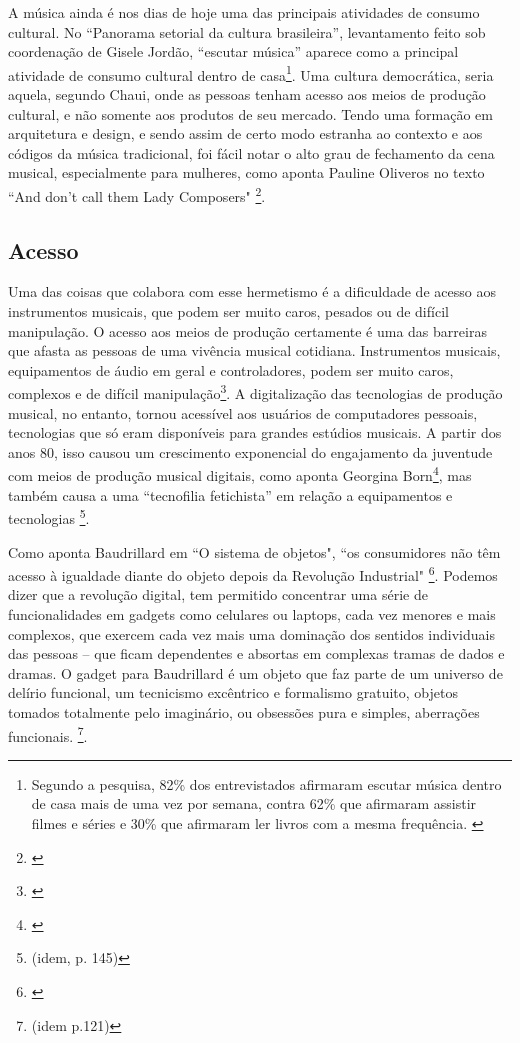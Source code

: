  A música ainda é nos dias de hoje uma das principais atividades de consumo cultural. No ``Panorama setorial da cultura brasileira'', levantamento feito sob coordenação de Gisele Jordão, ``escutar música'' aparece como a principal atividade de consumo cultural dentro de casa\footnote{Segundo a pesquisa, 82\% dos entrevistados afirmaram escutar música dentro de casa mais de uma vez por semana, contra 62\% que afirmaram assistir filmes e séries e 30\% que afirmaram ler livros com a mesma frequência. \cite[52]{Jordao2018}}. Uma cultura democrática, seria aquela, segundo Chaui, onde as pessoas tenham acesso aos meios de produção cultural, e não somente aos produtos de seu mercado. Tendo uma formação em arquitetura e design, e sendo assim de certo modo estranha ao contexto e aos códigos da música tradicional, foi fácil notar o alto grau de fechamento da cena musical, especialmente para mulheres, como aponta Pauline Oliveros no texto ``And don't call them Lady Composers" \footnote{\cite[48]{Oliveros2012}}. 

\subsection{Acesso}
Uma das coisas que colabora com esse hermetismo é a dificuldade de acesso aos instrumentos musicais, que podem ser muito caros, pesados ou de difícil manipulação. O acesso aos meios de produção certamente é uma das barreiras que afasta as pessoas de uma vivência musical cotidiana. Instrumentos musicais, equipamentos de áudio em geral e controladores, podem ser muito caros, complexos e de difícil manipulação\footnote{\cite{Fiebrink2007}}. A digitalização das tecnologias de produção musical, no entanto, tornou acessível aos usuários de computadores pessoais, tecnologias que só eram disponíveis para grandes estúdios musicais. A partir dos anos 80, isso causou um crescimento exponencial do engajamento da juventude com meios de produção musical digitais, como aponta Georgina Born\footnote{\cite[143]{Born2015}}, mas também causa a uma ``tecnofilia fetichista'' em relação a equipamentos e tecnologias \footnote{(idem, p. 145)}.

Como aponta Baudrillard em ``O sistema de objetos", ``os consumidores não têm acesso à igualdade diante do objeto depois da Revolução Industrial" \footnote{\cite[162]{Baudrillard2012}}. Podemos dizer que a revolução digital, tem permitido concentrar uma série de funcionalidades em gadgets como celulares ou laptops, cada vez menores e mais complexos, que exercem cada vez mais uma dominação dos sentidos individuais das pessoas – que ficam dependentes e absortas em complexas tramas de dados e dramas. O gadget para Baudrillard é um objeto que faz parte de um universo de delírio funcional, um tecnicismo excêntrico e formalismo gratuito, objetos tomados totalmente pelo imaginário, ou obsessões pura e simples, aberrações funcionais. \footnote{(idem p.121)}. 

